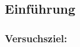 \subsection{Einführung} %
\label{sub:Einführung}
\begin{frame}
    \frametitle{Versuchsziel:}
    \framesubtitle{}
\end{frame}

